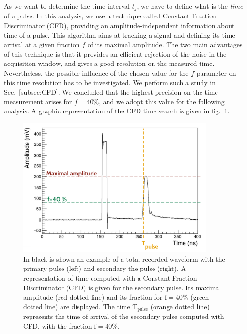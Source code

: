 As we want to determine the time interval $t_{j}$, we have to define what is the \emph{time} of a pulse.
In this analysis, we use a technique called Constant Fraction Discriminator (CFD), providing an amplitude-independent information about time of a pulse.
This algorithm aims at tracking a signal and defining its time arrival at a given fraction $f$ of its maximal amplitude.
The two main advantages of this technique is that it provides an efficient rejection of the noise in the acquisition window, and gives a good resolution on the measured time.
Nevertheless, the possible influence of the chosen value for the $f$ parameter on this time resolution has to be investigated.
We perform such a study in Sec.~\ref{subsec:CFD}.
We concluded that the highest precision on the time measurement arises for $f = 40\%$, and we adopt this value for the following analysis.
A graphic representation of the CFD time search is given in fig.~\ref{fig:CFD}.
\begin{figure}
  \centering
  \includegraphics[width=10cm]{commissioning/fig_commissioning/CFD_example.pdf}

  \caption{In black is shown an example of a total recorded waveform with the primary pulse (left) and secondary the pulse (right).
    A representation of time computed with a Constant Fraction Discriminator (CFD) is given for the secondary pulse.
    Its maximal amplitude (red dotted line) and its fraction for $\text{f}=40\%$ (green dotted line) are displayed.
    The time $\text{T}_{\text{pulse}}$ (orange dotted line) represents the time of arrival of the secondary pulse computed with CFD, with the fraction $\text{f}=40\%$.
    \label{fig:CFD}}
\end{figure}


